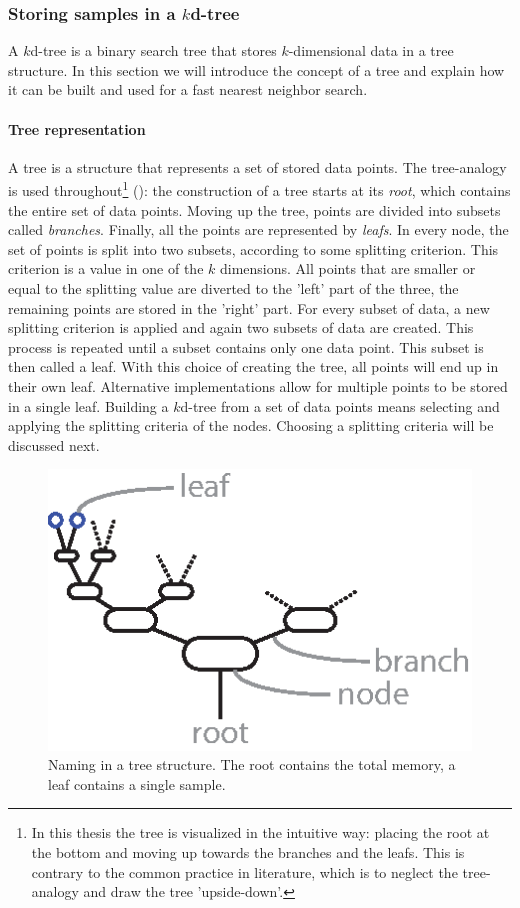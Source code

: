 \subsubsection{Storing samples in a $k$d-tree}\label{sec:LLR-kd-tree}
A $k$d-tree is a binary search tree that stores $k$-dimensional data in a tree structure. In this section we will introduce the concept of a tree and explain how it can be built and used for a fast nearest neighbor search.


\paragraph{Tree representation}
A tree is a structure that represents a set of stored data points. The tree-analogy is used throughout\footnote{In this thesis the tree is visualized in the intuitive way: placing the root at the bottom and moving up towards the branches and the leafs. This is contrary to the common practice in literature, which is to neglect the tree-analogy and draw the tree 'upside-down'.} (): the construction of a tree starts at its \emph{root}, which contains the entire set of data points. Moving up the tree, points are divided into subsets called \emph{branches}. Finally, all the points are represented by \emph{leafs}. In every node, the set of points is split into two subsets, according to some splitting criterion. This criterion is a value in one of the $k$ dimensions. All points that are smaller or equal to the splitting value are diverted to the 'left' part of the three, the remaining points are stored in the 'right' part. For every subset of data, a new splitting criterion is applied and again two subsets of data are created. This process is repeated until a subset contains only one data point. This subset is then called a leaf. With this choice of creating the tree, all points will end up in their own leaf. Alternative implementations allow for multiple points to be stored in a single leaf. Building a $k$d-tree from a set of data points means selecting and applying the splitting criteria of the nodes. Choosing a splitting criteria will be discussed next.
\begin{figure}[htbp]
	\centering
		\includegraphics[width=.3\textwidth]{img/kdtree_naming}
	\caption[Naming in a tree structure]{Naming in a tree structure. The root contains the total memory, a leaf contains a single sample.}
	\label{fig:LLR-kdtree_naming}
\end{figure}

